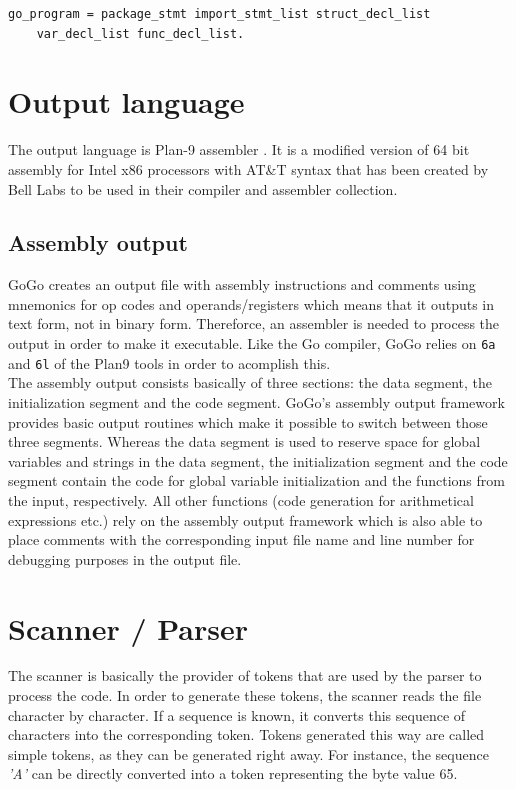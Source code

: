 \documentclass[a4paper]{scrartcl}
\let\chapter\section
\let\section\subsection
\let\subsection\subsubsection
\let\subsubsection\paragraph
\let\paragraph\subparagraph
\let\subparagraph\undefined
\begin{document}
        \begin{lstlisting}[caption=GoGo Program]
go_program = package_stmt import_stmt_list struct_decl_list 
    var_decl_list func_decl_list.
        \end{lstlisting}


  \chapter{Output language}
    The output language is Plan-9 assembler \cite{pik00}. It is a modified version of 64 bit assembly for Intel x86 processors with AT\&T syntax that has been created by Bell Labs to be used in their compiler and assembler collection.
    
    \section{Assembly output}
      GoGo creates an output file with assembly instructions and comments using mnemonics for op codes and operands/registers which means that it outputs in text form, not in binary form. Thereforce, an assembler is needed to process the output in order to make it executable. Like the Go compiler, GoGo relies on \texttt{6a} and \texttt{6l} of the Plan9 tools in order to acomplish this\cite{pik00}.\\
      The assembly output consists basically of three sections: the data segment, the initialization segment and the code segment. GoGo's assembly output framework provides basic output routines which make it possible to switch between those three segments. Whereas the data segment is used to reserve space for global variables and strings in the data segment, the initialization segment and the code segment contain the code for global variable initialization and the functions from the input, respectively. All other functions (code generation for arithmetical expressions etc.) rely on the assembly output framework which is also able to place comments with the corresponding input file name and line number for debugging purposes in the output file.

  \chapter{Scanner / Parser}
    The scanner is basically the provider of tokens that are used by the parser
    to process the code. In order to generate these tokens, the scanner reads
    the file character by character. If a sequence is known, it converts this 
    sequence of characters into the corresponding token. Tokens generated this
    way are called simple tokens, as they can be generated right away. For 
    instance, the sequence \textit{'A'} can be directly converted into a token 
    representing the byte value 65. \\
\end{document}
